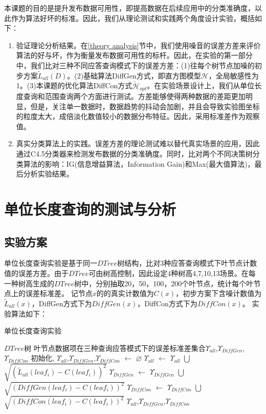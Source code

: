 本课题的目的是提升发布数据可用性，即提高数据在后续应用中的分类准确度，以此作为算法好坏的标准。因此，我们从理论测试和实践两个角度设计实验，概括如下：
\begin{enumerate}
	\item 验证理论分析结果。在\ref{theory analysis}节中，我们使用噪音的误差方差来评价算法的好与坏，作为衡量发布数据可用性的标杆。因此，在实验的第一部分中，我们比对三种不同应答查询模式下的误差方差：(1)往每个树节点加噪的初步方案$\tilde{L}_{all}(D)$。(2)基础算法DiffGen方式，即直方图模型$\mathcal{H}$，全局敏感性为1。(3)本课题的优化算法DiffCon方式$\tilde{\mathcal{H}}_{opt}$。在实验场景设计上，我们从单位长度查询和范围查询两个方面进行测试。方差能够使得两种数据的差距更加明显，但是，关注单一数据时，数据趋势的抖动会加剧，并且会导致实验图坐标的粒度太大，成倍淡化数值较小的数据分布特征。因此，采用标准差作为观察值。
	\item 真实分类算法上的实践。误差方差的理论测试难以替代真实场景的应用，因此通过C4.5分类器\cite{C45}来检测发布数据的分类准确度。同时，比对两个不同决策树分类算法的影响：IG(信息增益算法，Information Gain)和Max\cite{max}(最大值算法)，最后分析实验结果。
\end{enumerate}	

\section{单位长度查询的测试与分析} 
\subsection{实验方案}
单位长度查询实验是基于同一$DTree$树结构，比对3种应答查询模式下叶节点计数值的误差方差。由于$DTree$可由树高控制，因此设定4种树高{4,7,10,13}场景。在每一种树高生成的$DTree$树中，分别抽取20，50，100，200个叶节点，统计每个叶节点上的误差标准差。
记节点$x$的的真实计数值为$C(x)$，初步方案下含噪计数值为$\tilde{L}_{all}(x)$，DiffGen方式下为$DiffGen(x)$，DiffCon方式下为$DiffCon(x)$。
实验算法如下：
\begin{algorithm}[H]
	\caption{单位长度查询实验}
	\begin{algorithmic}[1]
		\REQUIRE $DTree$树
		\ENSURE 叶节点数据项在三种查询应答模式下的误差标准差集合$\Upsilon_{all}$,$\Upsilon_{DiffGen}$,$\Upsilon_{DiffCon}$
		初始化, $\Upsilon_{all}$,$\Upsilon_{DiffGen}$,$\Upsilon_{DiffCon}$ $\leftarrow$ $\varnothing$
		\STATE $\Upsilon_{all}$ $\leftarrow$ $\Upsilon_{all}$ $\bigcup$ $\sqrt {(\tilde{L}_{all}(leaf_{i})-C(leaf_{i}))^2}$
		\STATE $\Upsilon_{DiffGen}$ $\leftarrow$ $\Upsilon_{DiffGen}$ $\bigcup$ $\sqrt {(DiffGen(leaf_{i})-C(leaf_{i}))^2}$
		\STATE $\Upsilon_{DiffCon}$ $\leftarrow$ $\Upsilon_{DiffCon}$ $\bigcup$ $\sqrt {(DiffCon(leaf_{i})-C(leaf_{i}))^2}$
		\ENDFOR
		\RETURN $\Upsilon_{all}$,$\Upsilon_{DiffGen}$,$\Upsilon_{DiffCon}$
	\end{algorithmic}
\end{algorithm}



